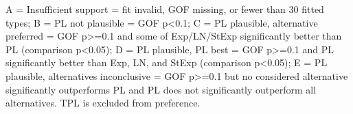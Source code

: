\begin{flushleft}\footnotesize A = Insufficient support = fit invalid, GOF missing, or fewer than 30 fitted types; B = PL not plausible = GOF p<0.1; C = PL plausible, alternative preferred = GOF p>=0.1 and some of Exp/LN/StExp significantly better than PL (comparison p<0.05); D = PL plausible, PL best = GOF p>=0.1 and PL significantly better than Exp, LN, and StExp (comparison p<0.05); E = PL plausible, alternatives inconclusive = GOF p>=0.1 but no considered alternative significantly outperforms PL and PL does not significantly outperform all alternatives. TPL is excluded from preference.\end{flushleft}
